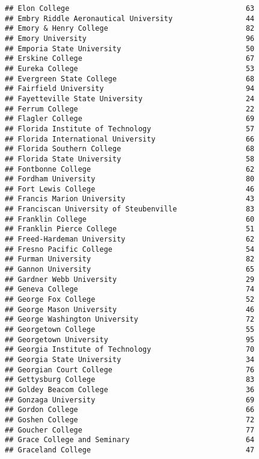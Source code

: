 \documentclass[
]{article}
\begin{document}
\begin{verbatim}
## Elon College                                         63
## Embry Riddle Aeronautical University                 44
## Emory & Henry College                                82
## Emory University                                     96
## Emporia State University                             50
## Erskine College                                      67
## Eureka College                                       53
## Evergreen State College                              68
## Fairfield University                                 94
## Fayetteville State University                        24
## Ferrum College                                       22
## Flagler College                                      69
## Florida Institute of Technology                      57
## Florida International University                     66
## Florida Southern College                             68
## Florida State University                             58
## Fontbonne College                                    62
## Fordham University                                   80
## Fort Lewis College                                   46
## Francis Marion University                            43
## Franciscan University of Steubenville                83
## Franklin College                                     60
## Franklin Pierce College                              51
## Freed-Hardeman University                            62
## Fresno Pacific College                               54
## Furman University                                    82
## Gannon University                                    65
## Gardner Webb University                              29
## Geneva College                                       74
## George Fox College                                   52
## George Mason University                              46
## George Washington University                         72
## Georgetown College                                   55
## Georgetown University                                95
## Georgia Institute of Technology                      70
## Georgia State University                             34
## Georgian Court College                               76
## Gettysburg College                                   83
## Goldey Beacom College                                36
## Gonzaga University                                   69
## Gordon College                                       66
## Goshen College                                       72
## Goucher College                                      77
## Grace College and Seminary                           64
## Graceland College                                    47

\end{verbatim}
\end{document}
